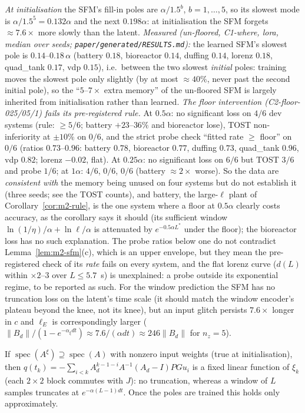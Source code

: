 \emph{At initialisation} the SFM's fill-in poles are $\alpha/1.5^{b}$, $b=1,\dots,5$, so its slowest mode is
$\alpha/1.5^5=0.132\alpha$ and the next $0.198\alpha$: at initialisation the SFM forgets $\approx7.6\times$ more slowly
than the latent. \emph{Measured (un-floored, C1-where, lora, median over seeds; \texttt{paper/generated/RESULTS.md}):}
the learned SFM's slowest pole is $0.14$--$0.18\,\alpha$ (battery $0.18$, bioreactor $0.14$, duffing $0.14$, lorenz $0.18$,
quad\_tank $0.17$, vdp $0.15$), i.e.\ between the two slowest \emph{initial} poles: training moves the slowest pole
only slightly (by at most $\approx40\%$, never past the second initial pole), so the ``$5$--$7\times$ extra memory'' of the
un-floored SFM is largely inherited from initialisation rather than learned.
\emph{The floor intervention (C2-floor-025/05/1) fails its pre-registered rule.} At $0.5\alpha$: no significant loss on
$4/6$ dev systems (rule: $\ge5/6$; battery $+23$--$36\%$ and bioreactor lose), TOST non-inferiority at $\pm10\%$ on $0/6$,
and the strict probe check ``fitted rate $\ge$ floor'' on $0/6$ (ratios $0.73$--$0.96$: battery $0.78$, bioreactor $0.77$,
duffing $0.73$, quad\_tank $0.96$, vdp $0.82$; lorenz $-0.02$, flat). At $0.25\alpha$: no significant loss on $6/6$ but
TOST $3/6$ and probe $1/6$; at $1\alpha$: $4/6$, $0/6$, $0/6$ (battery $\approx2\times$ worse). So the data are
\emph{consistent with} the memory being unused on four systems but do not establish it (three seeds; see the TOST counts),
and battery, the large-$\ell$ plant of Corollary~\ref{cor:m2-rule}, is the one system where a floor at $0.5\alpha$ clearly
costs accuracy, as the corollary says it should (its sufficient window $\ln(1/\eta)/\alpha+\ln\ell/\alpha$ is attenuated by
$e^{-0.5\alpha L^*}$ under the floor); the bioreactor loss has no such explanation. The probe ratios below one do not
contradict Lemma~\ref{lem:m2-sfm}(c), which is an upper envelope, but they mean the pre-registered check of its
\emph{rate} fails on every system, and the flat lorenz curve ($d(L)$ within $\times2$--$3$ over $L\le5.7$~s) is unexplained:
a probe outside its exponential regime, to be reported as such. For the window prediction the SFM has no truncation loss
on the latent's time scale (it
should match the window encoder's plateau beyond the knee, not its knee), but an input glitch persists $7.6\times$ longer
in $c$ and $\ell_E$ is correspondingly larger ($\|B_d\|/(1-e^{-\alpha_\xi dt})\approx7.6/(\alpha dt)\approx246\|B_d\|$
for $n_z=5$).

\begin{remark}
If $\operatorname{spec}(A^\xi)\supseteq\operatorname{spec}(A)$ with nonzero input weights (true at initialisation), then
$q(t_k)=-\sum_{i<k}A_d^{k-1-i}A^{-1}(A_d-I)PGu_i$ is a fixed linear function of $\xi_k$ (each $2\times2$ block commutes
with $J$): no truncation, whereas a window of $L$ samples truncates at $e^{-\alpha(L-1)dt}$. Once the poles are
trained this holds only approximately.
\end{remark}

